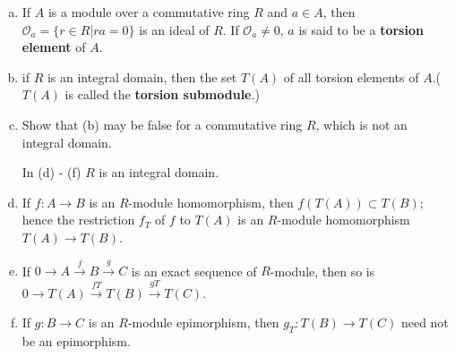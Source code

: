 \begin{ex}
    \begin{enumerate}[(a)]
        \item If $A$ is a module over a commutative ring $R$ and $a\in A$, then $\mathcal{O}_{a}=\{r\in R|ra=0\}$ is an ideal of $R$. If $\mathcal{O}_{a}\neq 0$, $a$ is said to be a \textbf{torsion element} of $A$.
        \item if $R$ is an integral domain, then the set $T(A)$ of all torsion elements of $A$.($T(A)$ is called the \textbf{torsion submodule}.)
        \item Show that (b) may be false for a commutative ring $R$, which is not an integral domain.
        
        In (d) - (f) $R$ is an integral domain.
        \item If $f:A\to B$ is an $R$-module homomorphism, then $f(T(A))\subset T(B)$; hence the restriction $f_{T}$ of $f$ to $T(A)$ is an $R$-module homomorphism $T(A)\to T(B)$.
        \item If $0\to A\xrightarrow{f} B\xrightarrow{g} C$ is an exact sequence of $R$-module, then so is $0\to T(A)\xrightarrow{fT} T(B)\xrightarrow{gT}T(C)$.
        \item If $g:B\to C$ is an $R$-module epimorphism, then $g_{T}:T(B)\to T(C)$ need not be an epimorphism.
    \end{enumerate}
\end{ex}

$$ $$

